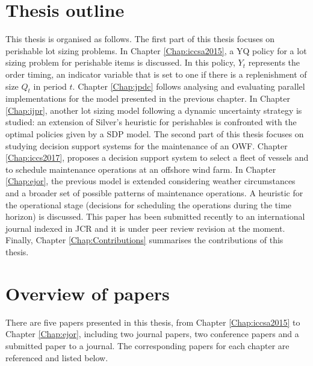 \section{Thesis outline}
\label{sec:outline}
This thesis is organised as follows. The first part of this thesis focuses on perishable lot sizing problems.
In Chapter \ref{Chap:iccsa2015}, a YQ policy for a lot sizing problem for perishable items is discussed. In this policy, $Y_t$ represents the order timing, an indicator variable that is set to one if there is a replenishment of size $Q_t$ in period $t$. Chapter \ref{Chap:jpdc} follows analysing and evaluating parallel implementations for the model presented in the previous chapter. In Chapter \ref{Chap:ijpr}, another lot sizing model following a dynamic uncertainty strategy is studied: an extension of Silver's heuristic for perishables is confronted with the optimal policies given by a SDP model. The second part of this thesis focuses on studying decision support systems for the maintenance of an OWF. Chapter \ref{Chap:iccs2017}, proposes a decision support system to select a fleet of vessels and to schedule maintenance operations at an offshore wind farm. In Chapter \ref{Chap:ejor}, the previous model is extended considering weather circumstances and a broader set of possible patterns of maintenance operations. A heuristic for the operational stage (decisions for scheduling the operations during the time horizon) is discussed. This paper has been submitted recently to an international journal indexed in JCR and it is under peer review revision at the moment. Finally, Chapter \ref{Chap:Contributions} summarises the contributions of this thesis.


\section{Overview of papers}

There are five papers presented in this thesis, from Chapter \ref{Chap:iccsa2015} to Chapter \ref{Chap:ejor}, including two journal papers, two conference papers and a submitted paper to a journal. The corresponding papers for each chapter are referenced and listed below.


